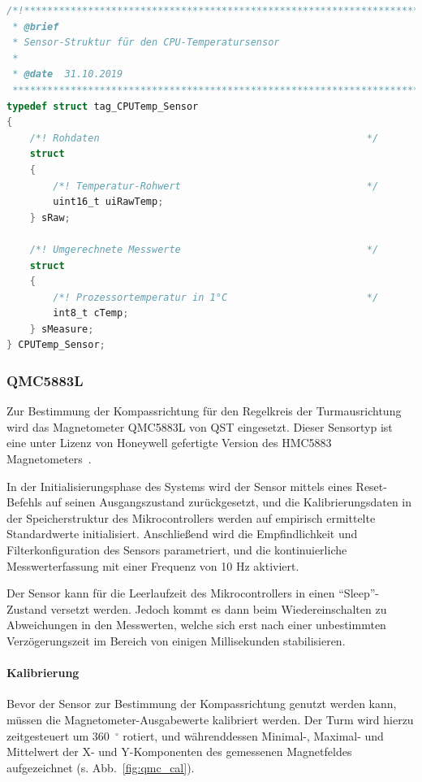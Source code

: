             \begin{lstlisting}[language=C,caption={Typdefinition für die Sensordaten-Speicherstruktur des internen Temperatursensors},label=lst:cputemp_typedef]
/*!****************************************************************************
 * @brief
 * Sensor-Struktur für den CPU-Temperatursensor
 *
 * @date  31.10.2019
 ******************************************************************************/
typedef struct tag_CPUTemp_Sensor
{
    /*! Rohdaten                                              */
    struct
    {
        /*! Temperatur-Rohwert                                */
        uint16_t uiRawTemp;
    } sRaw;
    
    /*! Umgerechnete Messwerte                                */
    struct
    {
        /*! Prozessortemperatur in 1°C                        */
        int8_t cTemp;
    } sMeasure;
} CPUTemp_Sensor;
            \end{lstlisting}

        \subsubsection{QMC5883L}\label{ssec:QMC5883L}
            Zur Bestimmung der Kompassrichtung für den Regelkreis der Turmausrichtung wird das Magnetometer QMC5883L von QST eingesetzt. Dieser Sensortyp ist eine unter Lizenz von Honeywell gefertigte Version des HMC5883 Magnetometers~\cite[S. 1]{ds_qmc5883l}.
            
            In der Initialisierungsphase des Systems wird der Sensor mittels eines Reset-Befehls auf seinen Ausgangszustand zurückgesetzt, und die Kalibrierungsdaten in der Speicherstruktur des Mikrocontrollers werden auf empirisch ermittelte Standardwerte initialisiert. Anschließend wird die Empfindlichkeit und Filterkonfiguration des Sensors parametriert, und die kontinuierliche Messwerterfassung mit einer Frequenz von 10 Hz aktiviert.
            
            Der Sensor kann für die Leerlaufzeit des Mikrocontrollers in einen ``Sleep''-Zustand versetzt werden. Jedoch kommt es dann beim Wiedereinschalten zu Abweichungen in den Messwerten, welche sich erst nach einer unbestimmten Verzögerungszeit im Bereich von einigen Millisekunden stabilisieren.
            
            \paragraph*{Kalibrierung}
            Bevor der Sensor zur Bestimmung der Kompassrichtung genutzt werden kann, müssen die Magnetometer-Ausgabewerte kalibriert werden. Der Turm wird hierzu zeitgesteuert um 360~$^\circ$ rotiert, und währenddessen Minimal-, Maximal- und Mittelwert der X- und Y-Komponenten des gemessenen Magnetfeldes aufgezeichnet (s. Abb.~\ref{fig:qmc_cal}).
            
